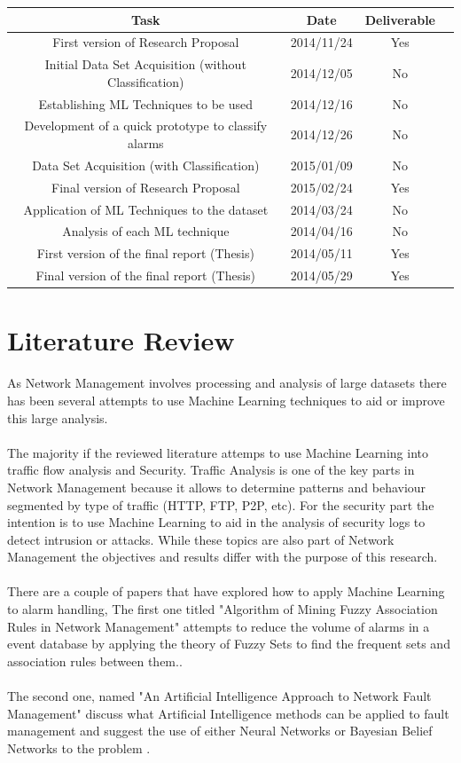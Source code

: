 \documentclass[10pt,a4paper]{article}
\begin{document}
\begin{center}
 \begin{tabular}{||c | c | c | c||} 
 \hline
 Task & Date & Deliverable \\ [0.7ex] 
 \hline\hline
 First version of Research Proposal  & 2014/11/24 & Yes \\ 
 \hline
 Initial Data Set Acquisition (without Classification) & 2014/12/05 & No \\ 
 \hline
 Establishing ML Techniques to be used & 2014/12/16 & No \\
 \hline
 Development of a quick prototype to classify alarms & 2014/12/26 & No \\
 \hline
 Data Set Acquisition (with Classification)  & 2015/01/09 & No \\
 \hline
 Final version of Research Proposal & 2015/02/24 & Yes \\ [1ex] 
 \hline
 Application of ML Techniques to the dataset & 2014/03/24 & No \\
 \hline
 Analysis of each ML technique & 2014/04/16 & No \\
 \hline
 First version of the final report (Thesis) & 2014/05/11 & Yes \\
 \hline
 Final version of the final report (Thesis) & 2014/05/29 & Yes \\

 \hline
\end{tabular}
\end{center}


  \section{Literature Review}
As Network Management involves processing and analysis of large datasets there has been several attempts to use Machine Learning techniques to aid or improve this large analysis.
\\\\
The majority if the reviewed literature attemps to use Machine Learning into traffic flow analysis and Security. Traffic Analysis is one of the key parts in Network Management because it allows to determine patterns and behaviour segmented by type of traffic (HTTP, FTP, P2P, etc). For the security part the intention is to use Machine Learning to aid in the analysis of security logs to detect intrusion or attacks. While these topics are also part of Network Management the objectives and results differ with the purpose of this research.
\\\\
There are a couple of papers that have explored how to apply Machine Learning to alarm handling, The first one titled "Algorithm of Mining Fuzzy Association Rules in Network Management" attempts to reduce the volume of alarms in a event database by applying the theory of Fuzzy Sets to find the frequent sets and association rules between them.\cite{liu2003}.
\\\\
The second one, named "An Artificial Intelligence Approach to Network Fault Management" discuss what Artificial Intelligence methods can be applied to fault management and suggest the use of either Neural Networks or Bayesian Belief Networks to the problem \cite{kefferundef}.
\end{document}
